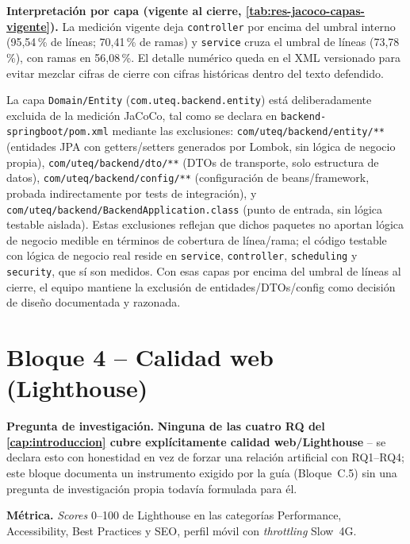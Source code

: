 \textbf{Interpretación por capa (vigente al cierre, \autoref{tab:res-jacoco-capas-vigente}).} La medición vigente deja \texttt{controller} por encima del umbral interno (95,54\,\% de líneas; 70,41\,\% de ramas) y \texttt{service} cruza el umbral de líneas (73,78\,\%), con ramas en 56,08\,\%. El detalle numérico queda en el XML versionado para evitar mezclar cifras de cierre con cifras históricas dentro del texto defendido.

La capa \texttt{Domain/Entity} (\texttt{com.uteq.backend.entity}) está deliberadamente excluida de la medición JaCoCo, tal como se declara en \texttt{backend-springboot/pom.xml} mediante las exclusiones: \texttt{com/uteq/backend/entity/**} (entidades JPA con getters/setters generados por Lombok, sin lógica de negocio propia), \texttt{com/uteq/backend/dto/**} (DTOs de transporte, solo estructura de datos), \texttt{com/uteq/backend/config/**} (configuración de beans/framework, probada indirectamente por tests de integración), y \texttt{com/uteq/backend/BackendApplication.class} (punto de entrada, sin lógica testable aislada). Estas exclusiones reflejan que dichos paquetes no aportan lógica de negocio medible en términos de cobertura de línea/rama; el código testable con lógica de negocio real reside en \texttt{service}, \texttt{controller}, \texttt{scheduling} y \texttt{security}, que sí son medidos. Con esas capas por encima del umbral de líneas al cierre, el equipo mantiene la exclusión de entidades/DTOs/config como decisión de diseño documentada y razonada.

\section{Bloque 4 -- Calidad web (Lighthouse)}
\label{sec:res-lighthouse}

\textbf{Pregunta de investigación.} \textbf{Ninguna de las cuatro RQ del
\autoref{cap:introduccion} cubre explícitamente calidad web/Lighthouse}
-- se declara esto con honestidad en vez de forzar una relación artificial
con RQ1--RQ4; este bloque documenta un instrumento exigido por la guía
(Bloque~C.5) sin una pregunta de investigación propia todavía formulada
para él.

\textbf{Métrica.} \emph{Scores} 0--100 de Lighthouse en las categorías
Performance, Accessibility, Best Practices y SEO, perfil móvil con
\emph{throttling} Slow~4G.

